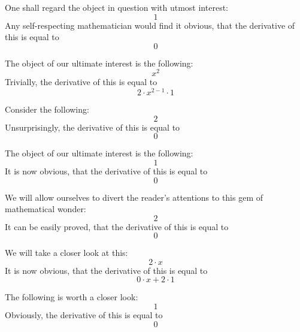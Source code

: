 \documentclass{article}
\begin{document}
One shall regard the object in question with utmost interest:
\begin{equation}
1 
\end{equation}
Any self-respecting mathematician would find it obvious, that the derivative of this is equal to
\begin{equation}
0 
\end{equation}

The object of our ultimate interest is the following:
\begin{equation}
x ^{2 } 
\end{equation}
Trivially, the derivative of this is equal to
\begin{equation}
2 \cdot x ^{2 - 1 } \cdot 1 
\end{equation}

Consider the following:
\begin{equation}
2 
\end{equation}
Unsurprisingly, the derivative of this is equal to
\begin{equation}
0 
\end{equation}

The object of our ultimate interest is the following:
\begin{equation}
1 
\end{equation}
It is now obvious, that the derivative of this is equal to
\begin{equation}
0 
\end{equation}

We will allow ourselves to divert the reader's attentions to this gem of mathematical wonder:
\begin{equation}
2 
\end{equation}
It can be easily proved, that the derivative of this is equal to
\begin{equation}
0 
\end{equation}

We will take a closer look at this:
\begin{equation}
2 \cdot x 
\end{equation}
It is now obvious, that the derivative of this is equal to
\begin{equation}
0 \cdot x + 2 \cdot 1 
\end{equation}

The following is worth a closer look:
\begin{equation}
1 
\end{equation}
Obviously, the derivative of this is equal to
\begin{equation}
0 
\end{equation}
\end{document}
